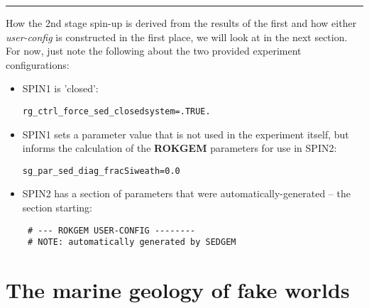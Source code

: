 \vspace{1mm}
\noindent\rule{4cm}{0.1mm}
\vspace{2mm}

\noindent How the 2nd stage spin-up is derived from the results of the first and how either \textit{user-config} is constructed in the first place, we will look at in the next section. For now, just note the following about the two provided experiment configurations:

\vspace{1mm}

\begin{itemize}[noitemsep]
\vspace{1mm}
\item SPIN1 is 'closed':
\vspace{-1mm}\small\begin{verbatim}
rg_ctrl_force_sed_closedsystem=.TRUE.
\end{verbatim}\normalsize\vspace{-1mm}
\vspace{1mm}
\item SPIN1 sets a parameter value that is not used in the experiment itself, but informs the calculation of the \textbf{ROKGEM} parameters for use in SPIN2:
\vspace{-1mm}\small\begin{verbatim}
sg_par_sed_diag_fracSiweath=0.0
\end{verbatim}\normalsize\vspace{-1mm}
\vspace{1mm}
\item SPIN2 has a section of parameters that were automatically-generated -- the section starting:
\vspace{-1mm}\small\begin{verbatim}
 # --- ROKGEM USER-CONFIG --------
 # NOTE: automatically generated by SEDGEM
\end{verbatim}\normalsize\vspace{-1mm}
\end{itemize}

\newpage

\section{The marine geology of fake worlds}

